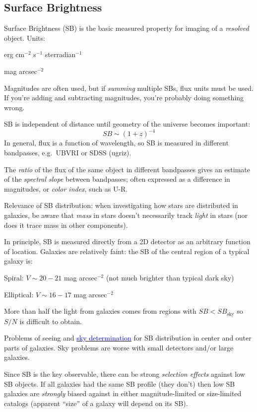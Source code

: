 \documentclass[12pt]{article}
\begin{document}
\subsection*{Surface Brightness}
Surface Brightness (SB) is the basic measured property for imaging of
a \emph{resolved} object. Units:
\begin{itemize*}
    \item erg cm$^{-2}$ s$^{-1}$ sterradian$^{-1}$
    \item mag arcsec$^{-2}$
\end{itemize*}
Magnitudes are often used, but if \emph{summing} multiple SBs, flux units
must be used. If you're adding and subtracting magnitudes, you're probably
doing something wrong. \Smiley

SB is independent of distance until geometry of the universe becomes
important:
$$SB \sim (1+z)^{-4}$$
In general, flux is a function of wavelength, so SB is measured in
different bandpasses, e.g.\ UBVRI or SDSS (ugriz).

The \emph{ratio} of the flux of the same object in different bandpasses
gives an estimate of the \emph{spectral slope} between bandpasses;
often expressed as a difference in magnitudes, or
\emph{color index}, such as U-R.

Relevance of SB distribution: when investigating how stars are distributed in
galaxies, be aware that \emph{mass} in stars doesn't necessarily track
\emph{light} in stars (nor does it trace mass in other components).

In principle, SB is measured directly from a 2D detector as an
arbitrary function of location.
Galaxies are relatively faint: the SB of the central region of a typical
galaxy is:
\begin{itemize*}
    \item Spiral: $V \sim 20 - 21$ mag arcsec$^{-2}$
        (not much brighter than typical dark sky)
    \item Elliptical: $V \sim 16 - 17$ mag arcsec$^{-2}$
\end{itemize*}
More than half the light from galaxies comes from regions with
$SB < SB_{\textrm{sky}}$ so $S/N$ is difficult to obtain.

Problems of seeing and \href{http://astronomy.nmsu.edu/holtz/a555/html/diagrams/a616/sky.htm}
{\textcolor{blue}{sky determination}} for SB distribution in center and
outer parts of galaxies. Sky problems are worse with small detectors and/or
large galaxies.

Since SB is the key observable, there can be strong \emph{selection effects}
against low SB objects. If all galaxies had the same SB profile (they don't)
then low SB galaxies are \emph{strongly} biased against in either
magnitude-limited or size-limited catalogs (apparent ``size'' of a galaxy will
depend on its SB).
\end{document}
